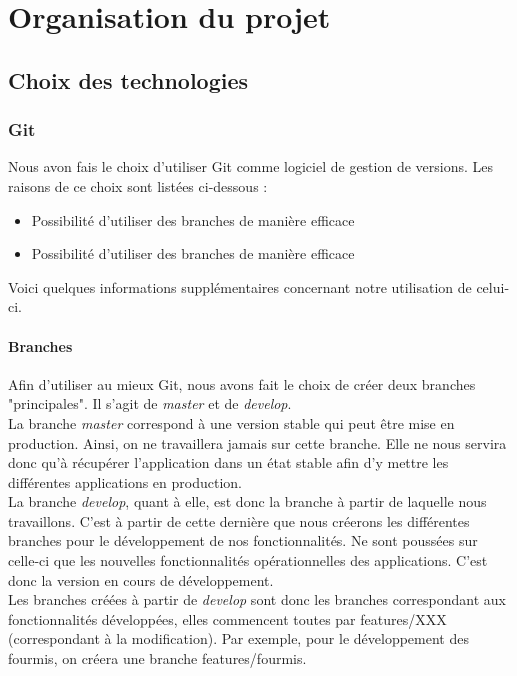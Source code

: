 \chapter{Organisation du projet}

	\section{Choix des technologies}

		\subsection{Git}

			Nous avon fais le choix d'utiliser Git comme logiciel de gestion de versions. Les raisons de ce choix sont listées ci-dessous :

			\begin{itemize}
				\item{Possibilité d'utiliser des branches de manière efficace}
				\item{Possibilité d'utiliser des branches de manière efficace}
			\end{itemize}

			Voici quelques informations supplémentaires concernant notre utilisation de celui-ci.

			\subsubsection{Branches}

				Afin d'utiliser au mieux Git, nous avons fait le choix de créer deux branches "principales". Il s'agit de \textit{master} et de \textit{develop}.\\
				La branche \textit{master} correspond à une version stable qui peut être mise en production. Ainsi, on ne travaillera jamais sur cette branche. Elle ne nous servira donc qu'à récupérer l'application dans un état stable afin d'y mettre les différentes applications en production.\\
				La branche \textit{develop}, quant à elle, est donc la branche à partir de laquelle nous travaillons. C'est à partir de cette dernière que nous créerons les différentes branches pour le développement de nos fonctionnalités. Ne sont poussées sur celle-ci que les nouvelles fonctionnalités opérationnelles des applications. C'est donc la version en cours de développement.\\
				Les branches créées à partir de \textit{develop} sont donc les branches correspondant aux fonctionnalités développées, elles commencent toutes par features/XXX (correspondant à la modification). Par exemple, pour le développement des fourmis, on créera une branche features/fourmis.

